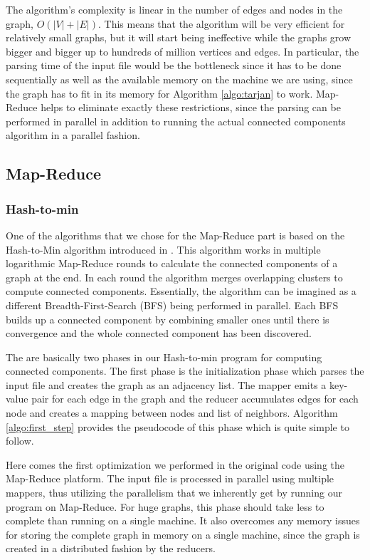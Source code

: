 The algorithm's complexity is linear in the number of edges and nodes in the graph, \ie $O(|V| + |E|)$. This means that the algorithm will be very efficient for relatively small graphs, but it will start being ineffective while the graphs grow bigger and bigger up to hundreds of million vertices and edges. In particular, the parsing time of the input file would be the bottleneck since it has to be done sequentially as well as the available memory on the machine we are using, since the graph has to fit in its memory for Algorithm \ref{algo:tarjan} to work. Map-Reduce helps to eliminate exactly these restrictions, since the parsing can be performed in parallel in addition to running the actual connected components algorithm in a parallel fashion.

\subsection{Map-Reduce}

\subsubsection{Hash-to-min}


One of the algorithms that we chose for the Map-Reduce part is based on the Hash-to-Min algorithm introduced in \cite{rastogi}. This algorithm works in multiple logarithmic Map-Reduce rounds  to calculate the connected components of a graph at the end. In each round the algorithm merges overlapping clusters to compute connected components. Essentially, the algorithm can be imagined as a different Breadth-First-Search (\eg BFS) being performed in parallel. Each BFS builds up a connected component by combining smaller ones until there is convergence and the whole connected component has been discovered.

The are basically two phases in our Hash-to-min program for computing connected components. The first phase is the initialization phase which parses the input file and creates the graph as an adjacency list. The mapper emits a key-value pair for each edge in the graph and the reducer accumulates edges for each node and creates a mapping between nodes and list of neighbors. Algorithm \ref{algo:first_step} provides the pseudocode of this phase which is quite simple to follow.

Here comes the first optimization we performed in the original code using the Map-Reduce platform. The input file is processed in parallel using multiple mappers, thus utilizing the parallelism that we inherently get by running our program on Map-Reduce. For huge graphs, this phase should take less to complete than running on a single machine. It also overcomes any memory issues for storing the complete graph in memory on a single machine, since the graph is created in a distributed fashion by the reducers.

